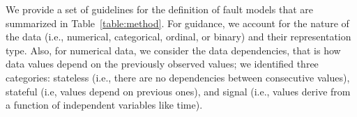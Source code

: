 We provide a set of guidelines for the definition of fault models that 
are summarized in Table~\ref{table:method}. 
For guidance,
we account for the nature of the data (i.e., numerical, categorical, ordinal, or binary) and their representation type.
Also, for numerical data, 
we consider 
the data dependencies, that is how data values depend on the previously observed values; we identified three categories: stateless (i.e., there are no dependencies between consecutive values), stateful (i.e, values depend on previous ones), and signal (i.e., values derive from a function of independent variables like time).

 


